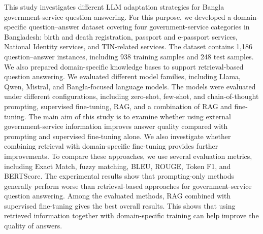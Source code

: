 \documentclass[10pt,journal,compsoc]{IEEEtran}
\begin{document}
This study investigates different LLM adaptation strategies for Bangla government-service question answering. For this purpose, we developed a domain-specific question--answer dataset covering four government-service categories in Bangladesh: birth and death registration, passport and e-passport services, National Identity services, and TIN-related services. The dataset contains 1,186 question--answer instances, including 938 training samples and 248 test samples. We also prepared domain-specific knowledge bases to support retrieval-based question answering. We evaluated different model families, including Llama, Qwen, Mistral, and Bangla-focused language models. The models were evaluated under different configurations, including zero-shot, few-shot, and chain-of-thought prompting, supervised fine-tuning, RAG, and a combination of RAG and fine-tuning.
The main aim of this study is to examine whether using external government-service information improves answer quality compared with prompting and supervised fine-tuning alone. We also investigate whether combining retrieval with domain-specific fine-tuning provides further improvements. To compare these approaches, we use several evaluation metrics, including Exact Match, fuzzy matching, BLEU, ROUGE, Token F1, and BERTScore. The experimental results show that prompting-only methods generally perform worse than retrieval-based approaches for government-service question answering. Among the evaluated methods, RAG combined with supervised fine-tuning gives the best overall results. This shows that using retrieved information together with domain-specific training can help improve the quality of answers.
\end{document}
